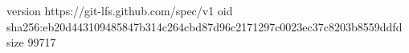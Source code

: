 version https://git-lfs.github.com/spec/v1
oid sha256:eb20d443109485847b314c264cbd87d96c2171297c0023ec37c8203b8559ddfd
size 99717

